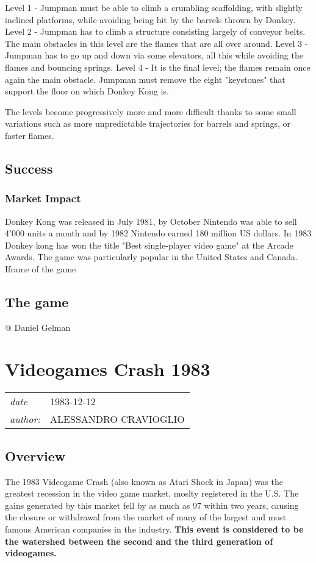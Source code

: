 \documentclass[a4paper,10pt]{book}
\newcommand{\pageHeader}[4]{
    \section{#1}
    \vspace{-0.3cm}
    \begin{table}[h!]
     \begin{tabular}{ll}
        \hline
        \textit{date} & #2 \\
        \textit{author: } & #3\\
        \hline
     \end{tabular}
    \end{table}
    \vspace{-0.3cm}
}
\begin{document}
 Level 1 - Jumpman must be able to climb a crumbling scaffolding, with slightly inclined platforms, while avoiding being hit by the barrels thrown by Donkey.  
 Level 2 - Jumpman has to climb a structure consisting largely of conveyor belts. The main obstacles in this level are the flames that are all over around. 
 Level 3 - Jumpman has to go up and down via some elevators, all this while avoiding the flames and bouncing springs.  
 Level 4 - It is the final level; the flames remain once again the main obstacle. Jumpman must remove the eight "keystones" that support the floor on which Donkey Kong is. 
 
                The levels become progressively more and more difficult thanks to some small variations such as more unpredictable trajectories for barrels and springs, or faster flames.  
 
 \subsection{Success }
 \subsubsection{Market Impact }
            Donkey Kong was released in July 1981, by October Nintendo was able to sell 4'000 units a month and by 1982 Nintendo earned 180 million US dollars. In 1983 Donkey kong has won the title "Best single-player video game" at the Arcade Awards. The game was
            particularly popular in the United States and Canada.
               \textbf{}   \textit{}
  Iframe of the game  
 
 \subsection{The game }
 
 
 
 
 @ Daniel Gelman 
 
 
 \newpage\pageHeader{Videogames Crash 1983}{1983-12-12}{ALESSANDRO CRAVIOGLIO}{The Videogames Crash is the event that ended the second generation}
 \subsection{Overview }
        The 1983 Videogame Crash (also known as Atari Shock in Japan) was the greatest recession in the video
        game market, moslty registered in the U.S. The gains generated by this market fell by as much as 97 within two years, causing the closure or
        withdrawal from the market of many of the largest and most famous American companies in the industry.  \textbf{This
        event is considered to be the watershed between the second and the third generation of videogames. } 
\end{document}
